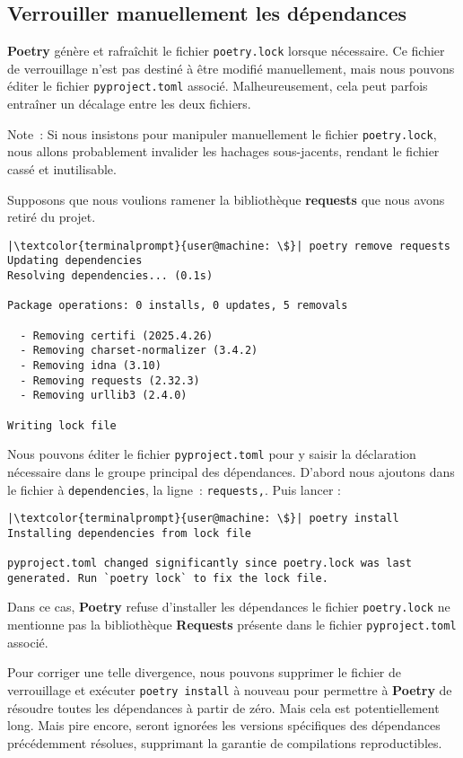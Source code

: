 \subsection*{Verrouiller manuellement les dépendances}
\textbf{Poetry} génère et rafraîchit le fichier \texttt{poetry.lock} lorsque nécessaire. Ce fichier de verrouillage n'est pas destiné à être modifié manuellement, mais nous pouvons éditer le fichier \texttt{pyproject.toml} associé. Malheureusement, cela peut parfois entraîner un décalage entre les deux fichiers.

Note : Si nous insistons pour manipuler manuellement le fichier \texttt{poetry.lock}, nous allons probablement invalider les hachages sous-jacents, rendant le fichier cassé et inutilisable.

Supposons que nous voulions ramener la bibliothèque \textbf{requests} que nous avons retiré du projet. 
\begin{lstlisting}[style=terminal]
|\textcolor{terminalprompt}{user@machine: \$}| poetry remove requests
Updating dependencies
Resolving dependencies... (0.1s)

Package operations: 0 installs, 0 updates, 5 removals

  - Removing certifi (2025.4.26)
  - Removing charset-normalizer (3.4.2)
  - Removing idna (3.10)
  - Removing requests (2.32.3)
  - Removing urllib3 (2.4.0)

Writing lock file
\end{lstlisting}

Nous pouvons éditer le fichier \texttt{pyproject.toml} pour y saisir la déclaration nécessaire dans le groupe principal des dépendances. D'abord nous ajoutons dans le fichier à \texttt{dependencies}, la ligne : \texttt{\og requests\fg{},}. Puis lancer :
\begin{lstlisting}[style=terminal]
|\textcolor{terminalprompt}{user@machine: \$}| poetry install
Installing dependencies from lock file

pyproject.toml changed significantly since poetry.lock was last generated. Run `poetry lock` to fix the lock file.
\end{lstlisting}

Dans ce cas, \textbf{Poetry} refuse d’installer les dépendances le fichier \texttt{poetry.lock} ne mentionne pas la bibliothèque \textbf{Requests} présente dans le fichier \texttt{pyproject.toml} associé.

Pour corriger une telle divergence, nous pouvons supprimer le fichier de verrouillage et exécuter \texttt{poetry install} à nouveau pour permettre à \textbf{Poetry} de résoudre toutes les dépendances à partir de zéro. Mais cela est potentiellement long. Mais pire encore, seront ignorées les versions spécifiques des dépendances précédemment résolues, supprimant la garantie de compilations reproductibles.

